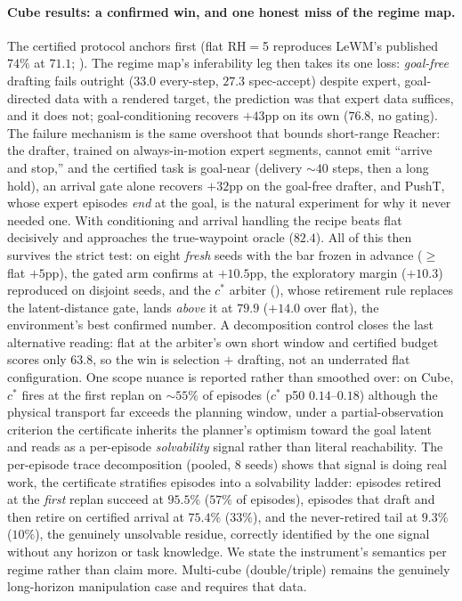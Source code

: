 \documentclass{article}
\begin{document}
\paragraph{Cube results: a confirmed win, and one honest miss of the regime map.}
The certified protocol anchors first (flat RH$=$5 reproduces LeWM's published $74\%$
at $71.1$; ). The regime map's inferability leg then takes its one
loss: \emph{goal-free} drafting fails outright ($33.0$ every-step, $27.3$
spec-accept) despite expert, goal-directed data with a rendered target, the
prediction was that expert data suffices, and it does not; goal-conditioning recovers
$+43$pp on its own ($76.8$, no gating). The failure mechanism is the same overshoot
that bounds short-range Reacher: the drafter, trained on always-in-motion expert
segments, cannot emit ``arrive and stop,'' and the certified task is goal-near
(delivery ${\sim}40$ steps, then a long hold), an arrival gate alone recovers
$+32$pp on the goal-free drafter, and PushT, whose expert episodes \emph{end} at the
goal, is the natural experiment for why it never needed one. With conditioning and
arrival handling the recipe beats flat decisively and approaches the true-waypoint
oracle ($82.4$). All of this then survives the strict test: on eight \emph{fresh}
seeds with the bar frozen in advance ($\ge$ flat $+5$pp), the gated arm confirms at
$+10.5$pp, the exploratory margin ($+10.3$) reproduced on disjoint seeds, and
the $c^{*}$ arbiter (), whose retirement rule replaces the
latent-distance gate, lands \emph{above} it at $79.9$ ($+14.0$ over flat), the
environment's best confirmed number. A decomposition control closes the last
alternative reading: flat at the arbiter's own short window and certified budget
scores only $63.8$, so the win is selection $+$ drafting, not an underrated flat
configuration. One scope nuance is reported rather than smoothed over: on Cube,
$c^{*}$ fires at the first replan on ${\sim}55\%$ of episodes ($c^{*}$ p50
$0.14$--$0.18$) although the physical transport far exceeds the planning window, under a partial-observation criterion the certificate inherits the planner's optimism
toward the goal latent and reads as a per-episode \emph{solvability} signal rather
than literal reachability. The per-episode trace decomposition (pooled, $8$ seeds)
shows that signal is doing real work, the certificate stratifies episodes into a
solvability ladder: episodes retired at the \emph{first} replan succeed at $95.5\%$
($57\%$ of episodes), episodes that draft and then retire on certified arrival at
$75.4\%$ ($33\%$), and the never-retired tail at $9.3\%$ ($10\%$), the genuinely
unsolvable residue, correctly identified by the one signal without any horizon or
task knowledge. We state the instrument's semantics per regime rather than claim
more. Multi-cube (double/triple) remains the genuinely long-horizon manipulation
case and requires that data.
\end{document}
